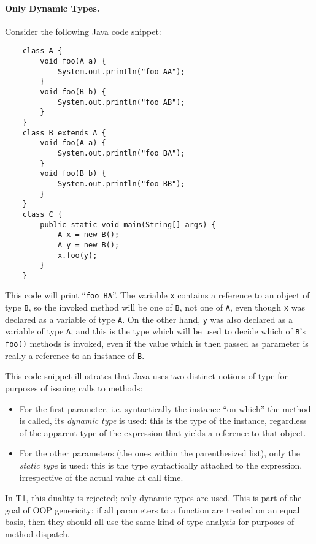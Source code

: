 \paragraph{Only Dynamic Types.} Consider the following Java code snippet:
\begin{verbatim}
    class A {
        void foo(A a) {
            System.out.println("foo AA");
        }
        void foo(B b) {
            System.out.println("foo AB");
        }
    }
    class B extends A {
        void foo(A a) {
            System.out.println("foo BA");
        }
        void foo(B b) {
            System.out.println("foo BB");
        }
    }
    class C {
        public static void main(String[] args) {
            A x = new B();
            A y = new B();
            x.foo(y);
        }
    }
\end{verbatim}
This code will print ``\verb+foo BA+''. The variable \verb+x+ contains
a reference to an object of type \verb+B+, so the invoked method will
be one of \verb+B+, not one of \verb+A+, even though \verb+x+ was declared
as a variable of type \verb+A+. On the other hand, \verb+y+ was also
declared as a variable of type \verb+A+, and this is the type which will
be used to decide which of \verb+B+'s \verb+foo()+ methods is invoked,
even if the value which is then passed as parameter is really a reference
to an instance of \verb+B+.

This code snippet illustrates that Java uses two distinct notions of type
for purposes of issuing calls to methods:
\begin{itemize}

    \item For the first parameter, i.e. syntactically the instance ``on
    which'' the method is called, its \emph{dynamic type} is used: this
    is the type of the instance, regardless of the apparent type of the
    expression that yields a reference to that object.

    \item For the other parameters (the ones within the parenthesized
    list), only the \emph{static type} is used: this is the type
    syntactically attached to the expression, irrespective of the actual
    value at call time.

\end{itemize}
In T1, this duality is rejected; only dynamic types are used. This is
part of the goal of OOP genericity: if all parameters to a function are
treated on an equal basis, then they should all use the same kind of
type analysis for purposes of method dispatch.

